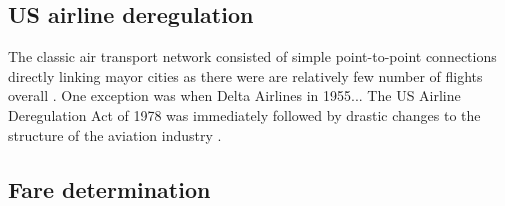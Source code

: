 \label{sec:background}

\subsection{US airline deregulation}
\label{subsec:b_deregulation}
The classic air transport network consisted of simple point-to-point connections directly linking mayor cities as there were are relatively few number of flights overall \cite{marti2015efficiency}. One exception was when Delta Airlines in 1955...
The US Airline Deregulation Act of 1978 was immediately followed by drastic changes to the structure of the aviation industry \citep{daraban2012low}.

\subsection{Fare determination}
\label{subsec:b_fare}
